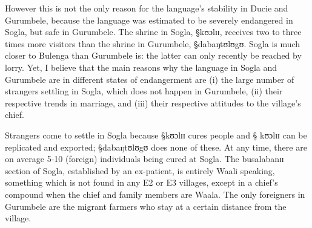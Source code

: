 However this is not the only reason for the language's stability in Ducie and
Gurumbele, because the language was estimated to be severely endangered in
Sogla, but safe in Gurumbele. The shrine in Sogla, {\S kʊɔlɪɪ}, receives two to
three times more visitors than the shrine in Gurumbele, {\S dabaŋtʊlʊgʊ}. Sogla
is much closer to Bulenga than Gurumbele is: the latter can only recently  be
reached  by lorry. Yet,  I believe that the main reasons why the language in
Sogla and Gurumbele are in different states of endangerment are  (i) the large
number of strangers settling in Sogla, which does not happen in Gurumbele,  (ii)
their respective trends in marriage, and (iii) their respective attitudes to the
village's chief. 


Strangers come to settle in Sogla because {\S kʊɔlɪɪ} cures people and {\S
kʊɔlɪɪ} can be replicated and exported;  {\S dabaŋtʊlʊgʊ} does none of these. At
any time, there are on average 5-10 (foreign) individuals being cured at
Sogla. The busalabanɪɪ section of Sogla, established by an ex-patient,  is
entirely Waali
speaking, something which is not found in any E2 or E3 villages, except in  a
chief's compound when the chief and family members are Waala. The only
foreigners in Gurumbele are the
migrant farmers who stay at a certain distance from the village. 


